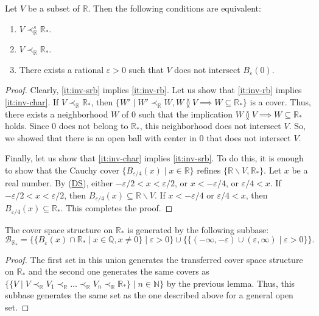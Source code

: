 \documentclass[reqno]{amsart}
\newcommand{\axref}[1]{(\hyperref[ax:#1]{#1})}
\theoremstyle{definition}
\theoremstyle{remark}
\numberwithin{figure}{section}
\newcommand{\overlap}[2]{#1 \between #2}
\newcommand{\rb}{\prec}
\begin{document}
\begin{lem}
Let $V$ be a subset of $\mathbb{R}$.
Then the following conditions are equivalent:
\begin{enumerate}
\item \label{it:inv-srb} $V \rb^s_\mathbb{R} \mathbb{R}_*$.
\item \label{it:inv-rb} $V \rb_\mathbb{R} \mathbb{R}_*$.
\item \label{it:inv-char} There exists a rational $\varepsilon > 0$ such that $V$ does not intersect $B_\varepsilon(0)$.
\end{enumerate}
\end{lem}
\begin{proof}
Clearly, \eqref{it:inv-srb} implies \eqref{it:inv-rb}.
Let us show that \eqref{it:inv-rb} implies \eqref{it:inv-char}.
If $V \rb_\mathbb{R} \mathbb{R}_*$, then $\{ W' \mid W' \rb_\mathbb{R} W, \overlap{W}{V} \implies W \subseteq \mathbb{R}_* \}$ is a cover.
Thus, there exists a neighborhood $W$ of $0$ such that the implication $\overlap{W}{V} \implies W \subseteq \mathbb{R}_*$ holds.
Since $0$ does not belong to $\mathbb{R}_*$, this neighborhood does not intersect $V$.
So, we showed that there is an open ball with center in $0$ that does not intersect $V$.

Finally, let us show that \eqref{it:inv-char} implies \eqref{it:inv-srb}.
To do this, it is enough to show that the Cauchy cover $\{ B_{\varepsilon/4}(x) \mid x \in \mathbb{R} \}$ refines $\{ \mathbb{R} \backslash V, \mathbb{R}_* \}$.
Let $x$ be a real number.
By \axref{DS}, either $-\varepsilon/2 < x < \varepsilon/2$, or $x < -\varepsilon/4$, or $\varepsilon/4 < x$.
If $-\varepsilon/2 < x < \varepsilon/2$, then $B_{\varepsilon/4}(x) \subseteq \mathbb{R} \backslash V$.
If $x < -\varepsilon/4$ or $\varepsilon/4 < x$, then $B_{\varepsilon/4}(x) \subseteq \mathbb{R}_*$.
This completes the proof.
\end{proof}

\begin{prop}
The cover space structure on $\mathbb{R}_*$ is generated by the following subbase:
\[ \mathcal{B}_{\mathbb{R}_*} = \{ \{ B_\varepsilon(x) \cap \mathbb{R}_* \mid x \in \mathbb{Q}, x \neq 0 \} \mid \varepsilon > 0 \} \cup \{ \{ (- \infty, - \varepsilon) \cup (\varepsilon, \infty) \mid \varepsilon > 0 \} \}. \]
\end{prop}
\begin{proof}
The first set in this union generates the transferred cover space structure on $\mathbb{R}_*$ and the second one generates the same covers as $\{ \{ V \mid V \rb_\mathbb{R} V_1 \rb_\mathbb{R} \ldots \rb_\mathbb{R} V_n \rb_\mathbb{R} \mathbb{R}_* \} \mid n \in \mathbb{N} \}$ by the previous lemma.
Thus, this subbase generates the same set as the one described above for a general open set.
\end{proof}
\end{document}
